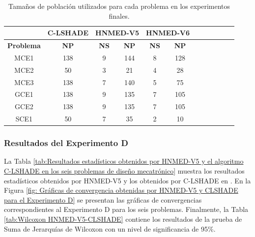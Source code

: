\begin{table}[]
	\centering
	\caption{Tamaños de población utilizados para cada problema en los experimentos finales.}
	\label{tab:Tamaños de población utilizados para cada problema en los experimentos finales}
	
	\begin{tabular}{cccccccccccc}
		& \textbf{C-LSHADE } & \multicolumn{2}{l}{\textbf{HNMED-V5}}&\multicolumn{2}{l}{\textbf{HNMED-V6}}\\
		\hline
		\textbf{Problema} & \textbf{NP}    & \textbf{NS} & \textbf{NP}& \textbf{NS}& \textbf{NP}\\
		\hline
		MCE1     & 138           & 9           & 144 &8&128   \\
		MCE2     & 50            & 3           & 21  &4&28       \\
		MCE3     & 138           & 7           & 140 &5&75      \\
		GCE1     & 138           & 9           & 135 &7&105        \\
		GCE2     & 138           & 9           & 135 &7&105    \\
		SCE1     & 50            & 7           & 35  &2&10       
	\end{tabular}
	
\end{table}


\subsubsection{Resultados del Experimento D}
La Tabla \ref{tab:Resultados estadísticos obtenidos por HNMED-V5 y el algoritmo C-LSHADE en los seis problemas de diseño mecatrónico} muestra los resultados estadísticos obtenidos por HNMED-V5 y los obtenidos por C-LSHADE en \cite{zapata_zapata_control_2017}. En la Figura \ref{fig: Gráficas de convergencia obtenidas por HNMED-V5 y CLSHADE para el Experimento D} se presentan las gráficas de convergencias correspondientes al Experimento D para los seis problemas. Finalmente, la Tabla \ref{tab:Wilcoxon HNMED-V5-CLSHADE} contiene los resultados de la prueba de Suma de Jerarquías de Wilcoxon con un nivel de significancia de 95\%.


